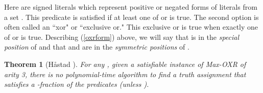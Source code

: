 \documentclass{article}
\newtheorem{thm}{Theorem}
\begin{document}
Here  are signed literals which represent positive or negated forms of literals from a set . This predicate is satisfied if at least one of  or  is true.  The second option  is often called an ``xor" or ``exclusive or." This exclusive or is true when exactly one of  or  is true. Describing (\ref{oxrform}) above, we will say that  is in the \textit{special position} of  and that  and  are in the \textit{symmetric positions} of . 

\begin{thm} [H{\aa}stad \cite{hast01}] \label{hastad2}
For any , given a satisfiable instance of Max-OXR of arity 3, there is no polynomial-time algorithm to find a truth assignment that satisfies a -fraction of the predicates (unless ). 
\end{thm}
\end{document}
